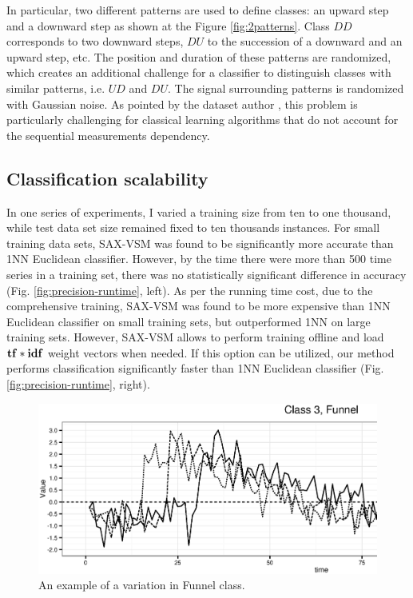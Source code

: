 In particular, two different patterns are used to define classes: an upward step and a downward step as 
shown at the Figure \ref{fig:2patterns}. Class $DD$ corresponds to two downward steps, $DU$ to the succession
of a downward and an upward step, etc. The position and duration of these patterns are randomized, 
which creates an additional challenge for a classifier to distinguish classes with similar patterns, i.e. $UD$ and $DU$.
The signal surrounding patterns is randomized with Gaussian noise. As pointed by the dataset author \cite{two_patterns},
this problem is particularly challenging for classical learning algorithms that do not account for the sequential 
measurements dependency.



\subsection{Classification scalability}
In one series of experiments, I varied a training size from ten to one thousand, while test data set size 
remained fixed to ten thousands instances. 
For small training data sets, SAX-VSM was found to be significantly more accurate than 1NN Euclidean
classifier. However, by the time there were more than 500 time series in a training set, there was no
statistically significant difference in accuracy (Fig. \ref{fig:precision-runtime}, left). 
As per the running time cost, due to the comprehensive training, SAX-VSM was found to be more
expensive than 1NN Euclidean classifier on small training sets, but outperformed 1NN on large
training sets.
However, SAX-VSM allows to perform training offline and load $\text{\textbf{tf}}\ast\text{\textbf{idf}}$ 
weight vectors when needed. If this option can be utilized, our method performs classification significantly
faster than 1NN Euclidean classifier (Fig. \ref{fig:precision-runtime}, right).

\begin{figure}[ht]
   \centering
   \includegraphics[width=120mm]{figures/funnels.ps}
   \caption{An example of a variation in Funnel class.}
   \label{fig:funnel}
\end{figure}

